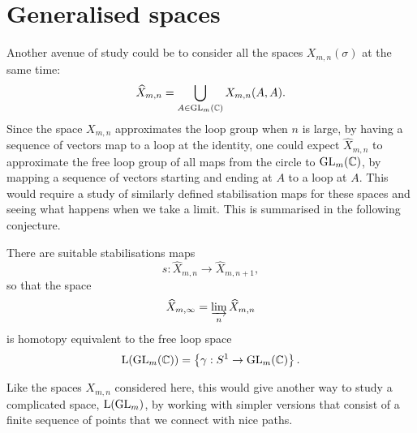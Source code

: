 \section{Generalised spaces}

Another avenue of study could be to consider all the spaces
$X_{m,n}(\sigma)$ at the same time:
\[ \widehat{X}_{m,n} = \bigcup_{A \in \operatorname{GL}_m(\mathbb{C})} X_{m,n}(A,A). \]
Since the space $X_{m,n}$ approximates the loop group when $n$ is
large, by having a sequence of vectors map to a loop at the identity,
one could expect $\widehat{X}_{m,n}$ to approximate the free loop
group of all maps from the circle to $\operatorname{GL}_m(\mathbb{C})$, by mapping a
sequence of vectors starting and ending at $A$ to a loop at $A$. This
would require a study of similarly defined stabilisation maps for
these spaces and seeing what happens when we take a limit. This
is summarised in the following conjecture.

\begin{conjecture}
  There are suitable stabilisations maps
  \[ s : \widehat{X}_{m,n} \to \widehat{X}_{m,n+1}, \]
  so that the space
  \[ \widehat{X}_{m,\infty} = \varinjlim_n \widehat{X}_{m,n} \]
  is homotopy equivalent to the free loop space
  \[ \mathrm{L}(\operatorname{GL}_m(\mathbb{C})) = \left\{  \gamma : S^1 \to \operatorname{GL}_m(\mathbb{C})  \right\}. \]
\end{conjecture}

Like the spaces $X_{m,n}$ considered here, this would give another way
to study a complicated space, $\mathrm{L}(\operatorname{GL}_m)$, by working with
simpler versions that consist of a finite sequence of points that we
connect with nice paths.




